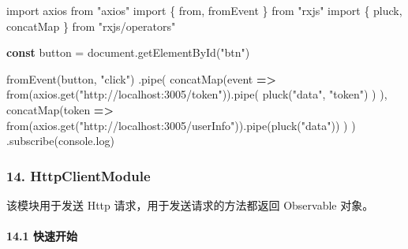 \documentclass[
]{article}
\newenvironment{Shaded}{}{}
\newcommand{\BuiltInTok}[1]{#1}
\newcommand{\FunctionTok}[1]{\textcolor[rgb]{0.02,0.16,0.49}{#1}}
\newcommand{\ImportTok}[1]{#1}
\newcommand{\KeywordTok}[1]{\textcolor[rgb]{0.00,0.44,0.13}{\textbf{#1}}}
\newcommand{\NormalTok}[1]{#1}
\newcommand{\OperatorTok}[1]{\textcolor[rgb]{0.40,0.40,0.40}{#1}}
\newcommand{\StringTok}[1]{\textcolor[rgb]{0.25,0.44,0.63}{#1}}
\begin{document}
\begin{Shaded}
\begin{Highlighting}[]
\ImportTok{import}\NormalTok{ axios }\ImportTok{from} \StringTok{"axios"}
\ImportTok{import}\NormalTok{ \{ }\ImportTok{from}\OperatorTok{,}\NormalTok{ fromEvent \} }\ImportTok{from} \StringTok{"rxjs"}
\ImportTok{import}\NormalTok{ \{ pluck}\OperatorTok{,}\NormalTok{ concatMap \} }\ImportTok{from} \StringTok{"rxjs/operators"}

\KeywordTok{const}\NormalTok{ button }\OperatorTok{=} \BuiltInTok{document}\OperatorTok{.}\FunctionTok{getElementById}\NormalTok{(}\StringTok{"btn"}\NormalTok{)}

\FunctionTok{fromEvent}\NormalTok{(button}\OperatorTok{,} \StringTok{"click"}\NormalTok{)}
  \OperatorTok{.}\FunctionTok{pipe}\NormalTok{(}
    \FunctionTok{concatMap}\NormalTok{(}\BuiltInTok{event} \KeywordTok{=\textgreater{}}
      \ImportTok{from}\NormalTok{(axios}\OperatorTok{.}\FunctionTok{get}\NormalTok{(}\StringTok{"http://localhost:3005/token"}\NormalTok{))}\OperatorTok{.}\FunctionTok{pipe}\NormalTok{(}
        \FunctionTok{pluck}\NormalTok{(}\StringTok{"data"}\OperatorTok{,} \StringTok{"token"}\NormalTok{)}
\NormalTok{      )}
\NormalTok{    )}\OperatorTok{,}
    \FunctionTok{concatMap}\NormalTok{(token }\KeywordTok{=\textgreater{}}
      \ImportTok{from}\NormalTok{(axios}\OperatorTok{.}\FunctionTok{get}\NormalTok{(}\StringTok{"http://localhost:3005/userInfo"}\NormalTok{))}\OperatorTok{.}\FunctionTok{pipe}\NormalTok{(}\FunctionTok{pluck}\NormalTok{(}\StringTok{"data"}\NormalTok{))}
\NormalTok{    )}
\NormalTok{  )}
  \OperatorTok{.}\FunctionTok{subscribe}\NormalTok{(}\BuiltInTok{console}\OperatorTok{.}\FunctionTok{log}\NormalTok{)}
\end{Highlighting}
\end{Shaded}

\hypertarget{14-httpclientmodule}{%
\subsubsection{14. HttpClientModule}\label{14-httpclientmodule}}

该模块用于发送 Http 请求，用于发送请求的方法都返回 Observable 对象。

\hypertarget{141-ux5febux901fux5f00ux59cb}{%
\paragraph{14.1 快速开始}\label{141-ux5febux901fux5f00ux59cb}}
\end{document}
